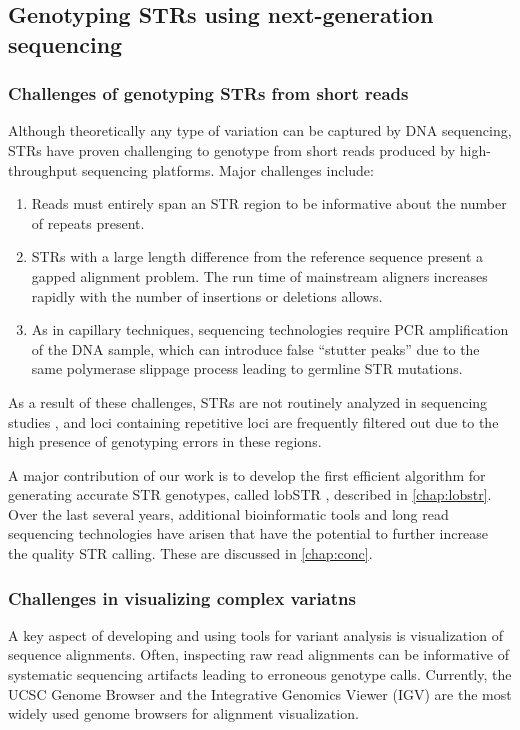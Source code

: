 \subsection{Genotyping STRs using next-generation sequencing}
\subsubsection{Challenges of genotyping STRs from short reads}
Although theoretically any type of variation can be captured by DNA sequencing, STRs have proven challenging to genotype from short reads produced by high-throughput sequencing platforms. Major challenges include:
\begin{enumerate}
\item Reads must entirely span an STR region to be informative about the number of repeats present.
\item STRs with a large length difference from the reference sequence present a gapped alignment problem. The run time of mainstream aligners increases rapidly  with the number of insertions or deletions allows.
\item As in capillary techniques, sequencing technologies require PCR amplification of the DNA sample, which can introduce false ``stutter peaks'' due to the same polymerase slippage process leading to germline STR mutations.
\end{enumerate}
As a result of these challenges, STRs are not routinely analyzed in sequencing studies \cite{TreangenSalzberg2012}, and loci containing repetitive loci are frequently filtered out due to the high presence of genotyping errors in these regions.

A major contribution of our work is to develop the first efficient algorithm for generating accurate STR genotypes, called lobSTR \cite{GymrekGolanRossetEtAl2012}, described in \autoref{chap:lobstr}. Over the last several years, additional bioinformatic tools and long read sequencing technologies have arisen that have the potential to further increase the quality STR calling. These are discussed in \autoref{chap:conc}.

\subsubsection{Challenges in visualizing complex variatns}
A key aspect of developing and using tools for variant analysis is visualization of sequence alignments. Often, inspecting raw read alignments can be informative of systematic sequencing artifacts leading to erroneous genotype calls. Currently, the UCSC Genome Browser \cite{KentSugnetFureyEtAl2002} and the Integrative Genomics Viewer (IGV) \cite{RobinsonThorvaldsdottirWincklerEtAl2011} are the most widely used genome browsers for alignment visualization.

